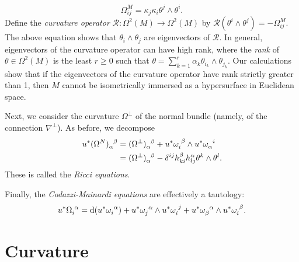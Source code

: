 \documentclass{book}
\newcommand{\scrR}{\mathscr{R}}
\renewcommand{\d}{\mathrm{d}}
\theoremstyle{definition}
\numberwithin{equation}{section}
\begin{document}
\begin{equation}
    \Omega^M_{ij} = \kappa_j \kappa_i \theta^j \wedge \theta^i.
\end{equation}
Define the \textit{curvature operator} $\scrR \colon \Omega^2(M) \to \Omega^2(M)$ by $\scrR(\theta^i \wedge \theta^j) = -\Omega^M_{ij}$. The above equation shows that $\theta_i \wedge \theta_j$ are eigenvectors of $\scrR$. In general, eigenvectors of the curvature operator can have high rank, where the \textit{rank} of $\theta \in \Omega^2(M)$ is the least $r \geq 0$ such that $\theta = \sum_{k=1}^r \alpha_k \theta_{i_k} \wedge \theta_{j_k}$. Our calculations show that if the eigenvectors of the curvature operator have rank strictly greater than 1, then $M$ cannot be isometrically immersed as a hypersurface in Euclidean space.

Next, we consider the curvature $\Omega^\bot$ of the normal bundle (namely, of the connection $\nabla^\bot$). As before, we decompose
\begin{equation} \begin{aligned}
    u^* \tensor{(\Omega^N)}{_\alpha^\beta} &= \tensor{(\Omega^\bot)}{_\alpha^\beta} + u^*\tensor{\omega}{_i^\beta} \wedge u^* \tensor{\omega}{_\alpha^i} \\ 
    &= \tensor{(\Omega^\bot)}{_\alpha^\beta} - \delta^{ij} h_{ki}^\beta h_{lj}^\alpha \theta^k \wedge \theta^l.
\end{aligned} \end{equation}
These is called the \textit{Ricci equations}.

Finally, the \textit{Codazzi-Mainardi equations} are effectively a tautology:
\begin{equation}
    u^*\tensor{\Omega}{_i^\alpha} = \d(u^*\tensor{\omega}{_i^\alpha}) + u^*\tensor{\omega}{_j^\alpha} \wedge u^*\tensor{\omega}{_i^j} + u^*\tensor{\omega}{_\beta^\alpha} \wedge u^*\tensor{\omega}{_i^\beta}.
\end{equation}



\chapter{Curvature}
\end{document}
